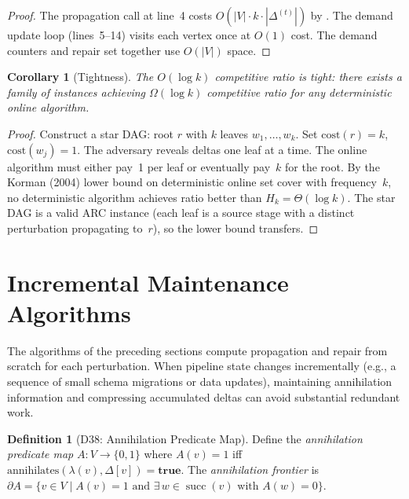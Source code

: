 \documentclass[11pt,a4paper]{article}
\newtheorem{corollary}[theorem]{Corollary}
\theoremstyle{definition}
\newtheorem{definition}[theorem]{Definition}
\newcommand{\ann}{\mathrm{annihilates}}
\newcommand{\cost}{\mathrm{cost}}
\DeclareMathOperator{\succ}{succ}
\begin{document}
\begin{proof}
The propagation call at line~4 costs $O(|V| \cdot k \cdot |\Delta^{(t)}|)$
by .  The demand update loop (lines~5--14)
visits each vertex once at $O(1)$ cost.  The demand counters and repair
set together use $O(|V|)$ space.
\end{proof}

\begin{corollary}[Tightness]\label{cor:adaptive-tight}
The $O(\log k)$ competitive ratio is tight: there exists a family of instances
achieving $\Omega(\log k)$ competitive ratio for any deterministic online
algorithm.
\end{corollary}

\begin{proof}
Construct a star DAG: root $r$ with $k$ leaves $w_1, \ldots, w_k$.  Set
$\cost(r) = k$, $\cost(w_j) = 1$.  The adversary reveals deltas one leaf at
a time.  The online algorithm must either pay~1 per leaf or eventually pay~$k$
for the root.  By the Korman (2004) lower bound on deterministic online set
cover with frequency~$k$, no deterministic algorithm achieves ratio better
than $H_k = \Theta(\log k)$.  The star DAG is a valid ARC instance
(each leaf is a source stage with a distinct perturbation propagating to~$r$),
so the lower bound transfers.
\end{proof}


\section{Incremental Maintenance Algorithms}
\label{sec:incremental-maintenance}

The algorithms of the preceding sections compute propagation and repair from
scratch for each perturbation.  When pipeline state changes incrementally
(e.g., a sequence of small schema migrations or data updates), maintaining
annihilation information and compressing accumulated deltas can avoid
substantial redundant work.

\begin{definition}[D38: Annihilation Predicate Map]\label{def:ann-map}
Define the \emph{annihilation predicate map} $A\colon V \to \{0, 1\}$ where
$A(v) = 1$ iff $\ann(\lambda(v), \Delta[v]) = \mathbf{true}$.
The \emph{annihilation frontier} is
$\partial A = \{v \in V \mid A(v) = 1 \text{ and } \exists\, w \in \succ(v)
\text{ with } A(w) = 0\}$.
\end{definition}
\end{document}
